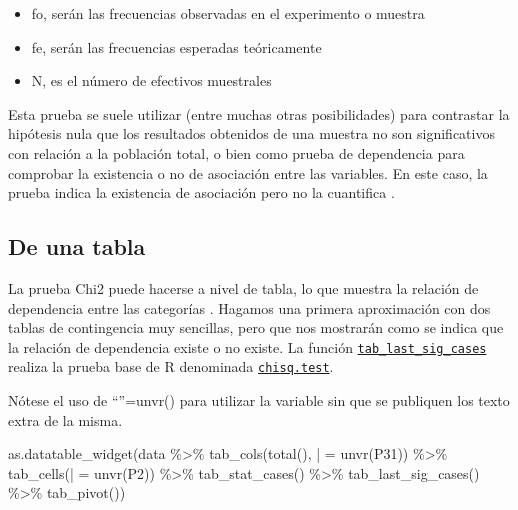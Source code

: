 \documentclass[
]{book}
\newenvironment{Shaded}{\begin{snugshade}}{\end{snugshade}}
\newcommand{\AttributeTok}[1]{\textcolor[rgb]{0.77,0.63,0.00}{#1}}
\newcommand{\FunctionTok}[1]{\textcolor[rgb]{0.00,0.00,0.00}{#1}}
\newcommand{\NormalTok}[1]{#1}
\newcommand{\OtherTok}[1]{\textcolor[rgb]{0.56,0.35,0.01}{#1}}
\newcommand{\SpecialCharTok}[1]{\textcolor[rgb]{0.00,0.00,0.00}{#1}}
\newcommand{\StringTok}[1]{\textcolor[rgb]{0.31,0.60,0.02}{#1}}
\providecommand{\tightlist}{%
  \setlength{\itemsep}{0pt}\setlength{\parskip}{0pt}}
\begin{document}
\begin{itemize}
\tightlist
\item
  fo, serán las frecuencias observadas en el experimento o muestra
\item
  fe, serán las frecuencias esperadas teóricamente
\item
  N, es el número de efectivos muestrales
\end{itemize}

Esta prueba se suele utilizar (entre muchas otras posibilidades) para contrastar la hipótesis nula que los resultados obtenidos de una muestra no son significativos con relación a la población total, o bien como prueba de dependencia para comprobar la existencia o no de asociación entre las variables. En este caso, la prueba indica la existencia de asociación pero no la cuantifica \citet{manzano1995}.

\hypertarget{de-una-tabla}{%
\subsection{De una tabla}\label{de-una-tabla}}

La prueba Chi2 puede hacerse a nivel de tabla, lo que muestra la relación de dependencia entre las categorías \citet{siegel1995estadistica}. Hagamos una primera aproximación con dos tablas de contingencia muy sencillas, pero que nos mostrarán como se indica que la relación de dependencia existe o no existe. La función \href{https://www.rdocumentation.org/packages/expss/versions/0.10.5/topics/tab_significance_options}{\texttt{tab\_last\_sig\_cases}} realiza la prueba base de R denominada \href{https://www.rdocumentation.org/packages/stats/versions/3.6.2/topics/chisq.test}{\texttt{chisq.test}}.

Nótese el uso de ``\textbar{}''=unvr() para utilizar la variable sin que se publiquen los texto extra de la misma.

\begin{Shaded}
\begin{Highlighting}[]
\FunctionTok{as.datatable\_widget}\NormalTok{(data }\SpecialCharTok{\%\textgreater{}\%}
  \FunctionTok{tab\_cols}\NormalTok{(}\FunctionTok{total}\NormalTok{(), }\StringTok{\textasciigrave{}}\AttributeTok{|}\StringTok{\textasciigrave{}} \OtherTok{=} \FunctionTok{unvr}\NormalTok{(P31)) }\SpecialCharTok{\%\textgreater{}\%}
  \FunctionTok{tab\_cells}\NormalTok{(}\StringTok{\textasciigrave{}}\AttributeTok{|}\StringTok{\textasciigrave{}} \OtherTok{=} \FunctionTok{unvr}\NormalTok{(P2)) }\SpecialCharTok{\%\textgreater{}\%}
  \FunctionTok{tab\_stat\_cases}\NormalTok{() }\SpecialCharTok{\%\textgreater{}\%}
  \FunctionTok{tab\_last\_sig\_cases}\NormalTok{() }\SpecialCharTok{\%\textgreater{}\%}
  \FunctionTok{tab\_pivot}\NormalTok{())}
\end{Highlighting}
\end{Shaded}
\end{document}
